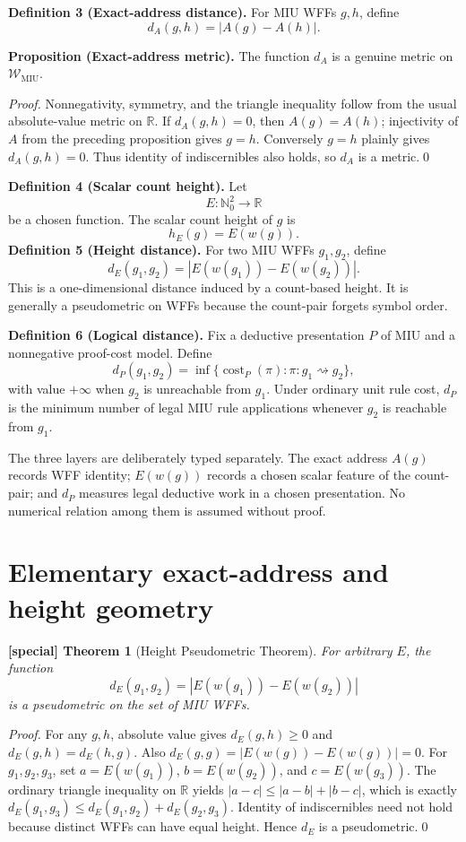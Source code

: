 \documentclass[11pt]{article}
\newtheorem{spthm}{[special] Theorem}
\newcommand{\WMIU}{\mathcal W_{\mathrm{MIU}}}
\newcommand{\dA}{d_A}
\newcommand{\dE}{d_E}
\newcommand{\dP}{d_P}
\begin{document}
\textbf{Definition 3 (Exact-address distance).} For MIU WFFs $g,h$, define
\[
\boxed{\dA(g,h)=|A(g)-A(h)|.}
\]

\textbf{Proposition (Exact-address metric).} The function $d_A$ is a genuine metric on $\WMIU$.

\textit{Proof.} Nonnegativity, symmetry, and the triangle inequality follow from the usual absolute-value metric on $\mathbb R$. If $d_A(g,h)=0$, then $A(g)=A(h)$; injectivity of $A$ from the preceding proposition gives $g=h$. Conversely $g=h$ plainly gives $d_A(g,h)=0$. Thus identity of indiscernibles also holds, so $d_A$ is a metric.\qed

\textbf{Definition 4 (Scalar count height).} Let
\[
E:\mathbb N_0^2\to\mathbb R
\]
be a chosen function. The scalar count height of $g$ is
\[
h_E(g)=E(w(g)).
\]
\textbf{Definition 5 (Height distance).} For two MIU WFFs $g_1,g_2$, define
\[
\boxed{\dE(g_1,g_2)=|E(w(g_1))-E(w(g_2))|.}
\]
This is a one-dimensional distance induced by a count-based height. It is generally a pseudometric on WFFs because the count-pair forgets symbol order.

\textbf{Definition 6 (Logical distance).} Fix a deductive presentation $P$ of MIU and a nonnegative proof-cost model. Define
\[
\dP(g_1,g_2)=\inf\{\operatorname{cost}_P(\pi):\pi:g_1\rightsquigarrow g_2\},
\]
with value $+\infty$ when $g_2$ is unreachable from $g_1$. Under ordinary unit rule cost, $\dP$ is the minimum number of legal MIU rule applications whenever $g_2$ is reachable from $g_1$.

The three layers are deliberately typed separately. The exact address $A(g)$ records WFF identity; $E(w(g))$ records a chosen scalar feature of the count-pair; and $d_P$ measures legal deductive work in a chosen presentation. No numerical relation among them is assumed without proof.

\section{Elementary exact-address and height geometry}
\begin{spthm}[Height Pseudometric Theorem]
For arbitrary $E$, the function
\[
\dE(g_1,g_2)=|E(w(g_1))-E(w(g_2))|
\]
is a pseudometric on the set of MIU WFFs.
\end{spthm}
\textit{Proof.} For any $g,h$, absolute value gives $\dE(g,h)\ge0$ and $\dE(g,h)=\dE(h,g)$. Also $\dE(g,g)=|E(w(g))-E(w(g))|=0$. For $g_1,g_2,g_3$, set $a=E(w(g_1))$, $b=E(w(g_2))$, and $c=E(w(g_3))$. The ordinary triangle inequality on $\mathbb R$ yields $|a-c|\le |a-b|+|b-c|$, which is exactly $\dE(g_1,g_3)\le\dE(g_1,g_2)+\dE(g_2,g_3)$. Identity of indiscernibles need not hold because distinct WFFs can have equal height. Hence $\dE$ is a pseudometric.\qed
\end{document}
